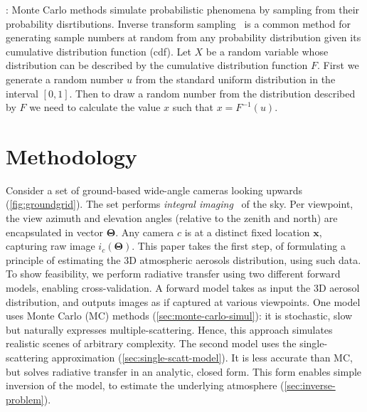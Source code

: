 \documentclass[10pt,letterpaper]{article}
\begin{document}
: Monte Carlo methods
simulate probabilistic phenomena by sampling from their probability
disrtibutions.  Inverse transform sampling~\cite{devroye1986sample} is a common method for generating
sample numbers at random from any probability distribution given its
cumulative distribution function (cdf).  Let $X$ be a random variable
whose distribution can be described by the cumulative distribution
function $F$.  First we generate a random number $u$ from the standard
uniform distribution in the interval $[0,1]$.  Then to draw a random
number from the distribution described by $F$ we need to calculate the
value $x$ such that $x = F^{-1}(u)$.



\section{Methodology}
\label{sec:methodology}

Consider a set of ground-based wide-angle cameras
looking upwards (\cref{fig:groundgrid}). The set performs {\em
  integral imaging}~\cite{integral} of the sky. Per viewpoint, the
view azimuth and elevation angles (relative to the zenith and north)
are encapsulated in vector ${\bm{\Theta}}$. Any camera $c$ is at a
distinct fixed location ${\bm x}$, capturing raw image
$i_c({\bm{\Theta}})$. This paper takes the first step, of formulating
a principle of estimating the 3D atmospheric aerosols distribution,
using such data. To show feasibility, we perform radiative transfer
using two different forward models, enabling cross-validation.  A
forward model takes as input the 3D aerosol distribution, and outputs
images as if captured at various viewpoints. One model uses Monte
Carlo (MC) methods (\cref{sec:monte-carlo-simul}): it is stochastic,
slow but naturally expresses multiple-scattering. Hence, this approach
simulates realistic scenes of arbitrary complexity.  The second model
uses the single-scattering approximation
(\cref{sec:single-scatt-model}). It is less accurate than MC, but
solves radiative transfer in an analytic, closed form. This form enables simple inversion of the model, to
estimate the underlying atmosphere (\cref{sec:inverse-problem}).

\end{document}
